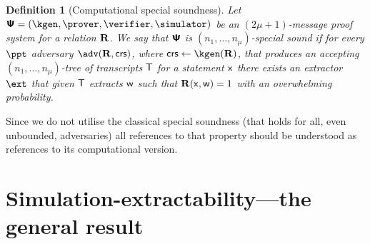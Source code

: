 \let\accentvec\vec \documentclass[runningheads,10pt]{llncs}
\newtheorem{definition}[theorem]{Definition}
\begin{document}
\begin{definition}[Computational special soundness]
	Let $\proofsystem = (\kgen, \prover, \verifier, \simulator)$ be an $(2 \mu +
	1)$-message proof system for a relation $\mathbf{R}$. 
	We say that $\bm{\mathsf{\Psi}}$ is $(n_1, \ldots, n_\mu)$-\emph{special sound} if
	for every $\ppt$ adversary $\adv(\REL, \crs)$, where $\crs \gets
	\kgen(\REL)$, that produces an accepting $(n_1, \ldots, n_\mu)$-tree of transcripts $\mathsf{T}$ for a statement $\mathsf{x}$ there exists an extractor $\ext$ that given $\mathsf{T}$ extracts $\mathsf{w}$ such that $\mathbf{R}(\mathsf{x}, \mathsf{w}) = 1$ with an overwhelming probability.
\end{definition}

Since we do not utilise the classical special soundness (that holds for all, even unbounded, adversaries) all references to that property should be understood as references to its computational version.


\section{Simulation-extractability---the general result}
\end{document}
